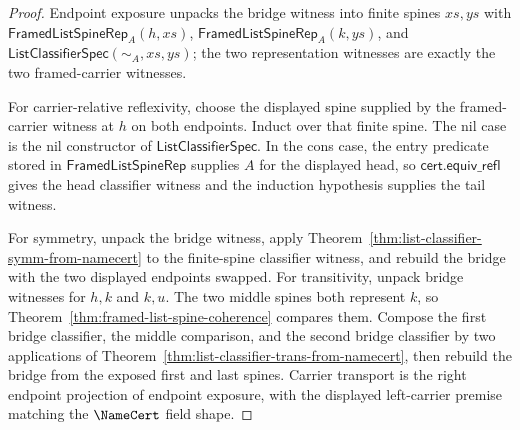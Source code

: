 \begin{proof}
Endpoint exposure unpacks the bridge witness into finite spines $xs,ys$ with
$\mathsf{FramedListSpineRep}_A(h,xs)$,
$\mathsf{FramedListSpineRep}_A(k,ys)$, and
$\mathsf{ListClassifierSpec}(\sim_A,xs,ys)$; the two representation witnesses
are exactly the two framed-carrier witnesses.

For carrier-relative reflexivity, choose the displayed spine supplied by the
framed-carrier witness at $h$ on both endpoints. Induct over that finite spine.
The nil case is the nil constructor of $\mathsf{ListClassifierSpec}$. In the
cons case, the entry predicate stored in $\mathsf{FramedListSpineRep}$ supplies
$A$ for the displayed head, so $\mathsf{cert.equiv\_refl}$ gives the head
classifier witness and the induction hypothesis supplies the tail witness.

For symmetry, unpack the bridge witness, apply
Theorem~\ref{thm:list-classifier-symm-from-namecert} to the finite-spine
classifier witness, and rebuild the bridge with the two displayed endpoints
swapped. For transitivity, unpack bridge witnesses for $h,k$ and $k,u$. The two
middle spines both represent $k$, so Theorem~\ref{thm:framed-list-spine-coherence}
compares them. Compose the first bridge classifier, the middle comparison, and
the second bridge classifier by two applications of
Theorem~\ref{thm:list-classifier-trans-from-namecert}, then rebuild the bridge
from the exposed first and last spines. Carrier transport is the right endpoint
projection of endpoint exposure, with the displayed left-carrier premise matching
the $\NameCert$ field shape.
\end{proof}

